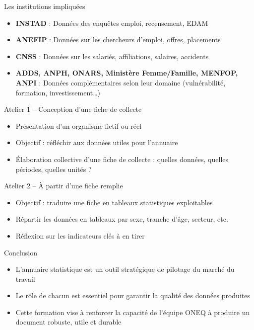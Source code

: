\documentclass{beamer}
\begin{document}
\begin{frame}{Les institutions impliquées}
\begin{itemize}
  \item \textbf{INSTAD} : Données des enquêtes emploi, recensement, EDAM
  \item \textbf{ANEFIP} : Données sur les chercheurs d’emploi, offres, placements
  \item \textbf{CNSS} : Données sur les salariés, affiliations, salaires, accidents
  \item \textbf{ADDS, ANPH, ONARS, Ministère Femme/Famille, MENFOP, ANPI} : Données complémentaires selon leur domaine (vulnérabilité, formation, investissement…)
\end{itemize}
\end{frame}

\begin{frame}{Atelier 1 -- Conception d’une fiche de collecte}
\begin{itemize}
  \item Présentation d’un organisme fictif ou réel
  \item Objectif : réfléchir aux données utiles pour l’annuaire
  \item Élaboration collective d’une fiche de collecte : quelles données, quelles périodes, quelles unités ?
\end{itemize}
\end{frame}

\begin{frame}{Atelier 2 -- À partir d’une fiche remplie}
\begin{itemize}
  \item Objectif : traduire une fiche en tableaux statistiques exploitables
  \item Répartir les données en tableaux par sexe, tranche d’âge, secteur, etc.
  \item Réflexion sur les indicateurs clés à en tirer
\end{itemize}
\end{frame}

\begin{frame}{Conclusion}
\begin{itemize}
  \item L’annuaire statistique est un outil stratégique de pilotage du marché du travail
  \item Le rôle de chacun est essentiel pour garantir la qualité des données produites
  \item Cette formation vise à renforcer la capacité de l’équipe ONEQ à produire un document robuste, utile et durable
\end{itemize}
\end{frame}
\end{document}
